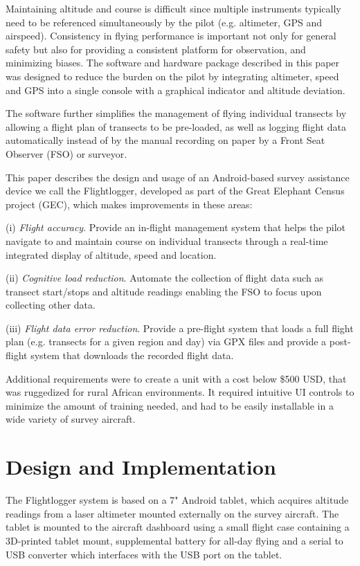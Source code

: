 \documentclass{sig-alternate-2013}
\begin{document}
Maintaining altitude and course is difficult since multiple instruments typically need to be referenced simultaneously by the pilot (e.g. altimeter, GPS and airspeed).  Consistency in flying performance is important not only for general safety but also for providing a consistent platform for observation, and minimizing biases. The software and hardware package described in this paper was designed to reduce the burden on the pilot by integrating altimeter, speed and GPS into a single console with a graphical indicator and altitude deviation.  

The software further simplifies the management of flying individual transects by allowing a flight plan of transects to be pre-loaded, as well as logging flight data automatically instead of by the manual recording on paper by a Front Seat Observer (FSO) or surveyor.  

This paper describes the design and usage of an Android-based survey assistance device we call the Flightlogger, developed as part of the Great Elephant Census project \cite{gec} (GEC), which makes improvements in these areas:

(i) \textit{Flight accuracy}. Provide an in-flight management system that helps the pilot navigate to and maintain course on individual transects through a real-time integrated display of altitude, speed and location.

(ii) \textit{Cognitive load reduction}. Automate the collection of flight data such as transect start/stops and altitude readings enabling the FSO to focus upon collecting other data.

(iii) \textit{Flight data error reduction}. Provide a pre-flight system that loads a full flight plan (e.g. transects for a given region and day) via GPX files and provide a post-flight system that downloads the recorded flight data.

Additional requirements were to create a unit with a cost below \$500 USD, that was ruggedized for rural African environments. It required intuitive UI controls to minimize the amount of training needed, and had to be easily installable in a wide variety of survey aircraft.
\section{Design and Implementation}
The Flightlogger system is based on a 7" Android tablet, which acquires altitude readings from a laser altimeter mounted externally on the survey aircraft.  The tablet is mounted to the aircraft dashboard using a small flight case containing a 3D-printed tablet mount, supplemental battery for all-day flying and a serial to USB converter which interfaces with the USB port on the tablet.
\end{document}
